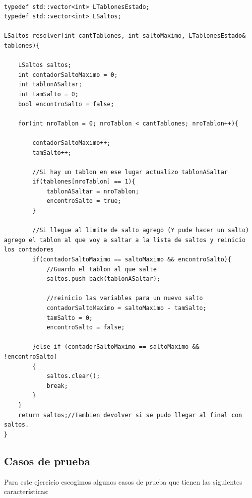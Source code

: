 \begin{lstlisting}

typedef std::vector<int> LTablonesEstado;
typedef std::vector<int> LSaltos;

LSaltos resolver(int cantTablones, int saltoMaximo, LTablonesEstado& tablones){

	LSaltos saltos;
	int contadorSaltoMaximo = 0;
	int tablonASaltar;
	int tamSalto = 0;
	bool encontroSalto = false;

	for(int nroTablon = 0; nroTablon < cantTablones; nroTablon++){

		contadorSaltoMaximo++;
		tamSalto++;
		
		//Si hay un tablon en ese lugar actualizo tablonASaltar
		if(tablones[nroTablon] == 1){
			tablonASaltar = nroTablon;
			encontroSalto = true;
		}
		
		//Si llegue al limite de salto agrego (Y pude hacer un salto) agrego el tablon al que voy a saltar a la lista de saltos y reinicio los contadores
		if(contadorSaltoMaximo == saltoMaximo && encontroSalto){			
			//Guardo el tablon al que salte
			saltos.push_back(tablonASaltar);

			//reinicio las variables para un nuevo salto
			contadorSaltoMaximo = saltoMaximo - tamSalto;
			tamSalto = 0;
			encontroSalto = false;

		}else if (contadorSaltoMaximo == saltoMaximo && !encontroSalto)
		{
			saltos.clear();
			break;
		}
	}
	return saltos;//Tambien devolver si se pudo llegar al final con saltos.
}

\end{lstlisting}

\subsection{Casos de prueba}

Para este ejercicio escogimos algunos casos de prueba que tienen las siguientes características:

